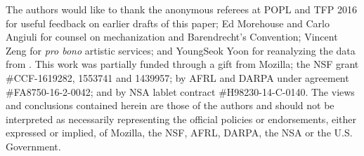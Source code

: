 
The authors would like to thank the anonymous referees at POPL and TFP 2016  for useful feedback on earlier drafts of this paper; Ed Morehouse and Carlo Angiuli for counsel on mechanization and Barendrecht's
Convention; Vincent Zeng for \textit{pro bono} artistic services; and YoungSeok Yoon for reanalyzing the data from \cite{6883030}.
This work was partially funded through a gift from Mozilla; the NSF grant \#CCF-1619282, 1553741 and 1439957; by AFRL and DARPA under agreement \#FA8750-16-2-0042; and by NSA lablet contract \#H98230-14-C-0140. The views and conclusions contained herein are those of the authors and should not be interpreted as necessarily representing the official policies or endorsements, either expressed or implied, of Mozilla, the NSF, AFRL, DARPA, the NSA or the U.S. Government.
